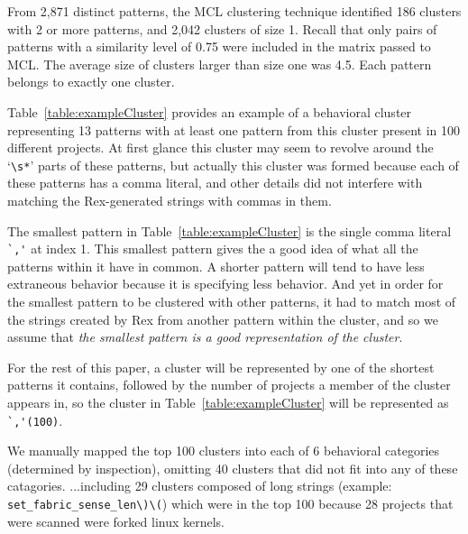 From 2,871 distinct patterns, the MCL clustering technique identified 186 clusters with 2 or more patterns, and 2,042 clusters of size 1.  Recall that only pairs of patterns with a similarity level of 0.75 were included in the matrix passed to MCL.  The average size of clusters larger than size one was 4.5.  Each pattern belongs to exactly one cluster.

Table~\ref{table:exampleCluster} provides an example of a behavioral cluster representing 13 patterns with at least one pattern from this cluster present in 100 different projects.  At first glance this cluster may seem to revolve around the `\verb!\s*!' parts of these patterns, but actually this cluster was formed because each of these patterns has a comma literal, and other details did not interfere with matching the Rex-generated strings with commas in them.


The smallest pattern in Table~\ref{table:exampleCluster} is the single comma literal \verb!`,'! at index 1.  This smallest pattern gives the a good idea of what all the patterns within it have in common.  A shorter pattern will tend to have less extraneous behavior because it is specifying less behavior.  And yet in order for the smallest pattern to be clustered with other patterns, it had to match most of the strings created by Rex from another pattern within the cluster, and so we assume that \emph{the smallest pattern is a good representation of the cluster}.

For the rest of this paper, a cluster will be represented by one of the shortest patterns it contains, followed by the number of projects a member of the cluster appears in, so the cluster in Table~\ref{table:exampleCluster} will be represented as \verb!`,'(100)!.

We  manually mapped the top 100 clusters into each of 6 behavioral categories (determined by inspection), omitting 40 clusters that did not fit into any of these catagories.
\leavevmode\color{gray}
 ...including 29 clusters composed of long strings (example: \verb!set_fabric_sense_len\)\(!) which were in the top 100 because 28 projects that were scanned were forked linux kernels.
\leavevmode\color{black}

